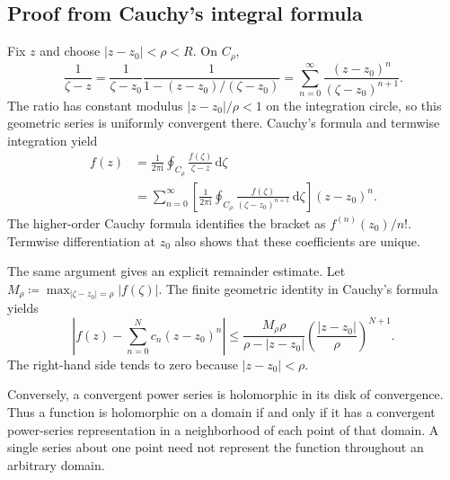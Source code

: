 \documentclass[11pt,a4paper]{article}
\theoremstyle{definition}
\theoremstyle{plain}
\newcommand{\dd}{\,\mathrm{d}}
\begin{document}
\subsection{Proof from Cauchy's integral formula}
Fix $z$ and choose $|z-z_0|<\rho<R$. On $C_\rho$,
\begin{equation}\label{eq:14}
\frac1{\zeta-z}
 =\frac1{\zeta-z_0}
    \frac1{1-(z-z_0)/(\zeta-z_0)}
 =\sum_{n=0}^{\infty}
       \frac{(z-z_0)^n}{(\zeta-z_0)^{n+1}}.
\end{equation}
The ratio has constant modulus $|z-z_0|/\rho<1$ on the integration
circle, so this geometric series is uniformly convergent there.
Cauchy's formula and termwise integration yield
\begin{equation}\label{eq:15}
\begin{aligned}
 f(z)&=\frac1{2\pi \mathrm{i}}\oint_{C_\rho}
                         \frac{f(\zeta)}{\zeta-z}\dd\zeta\\
 &=\sum_{n=0}^{\infty}
    \left[\frac1{2\pi \mathrm{i}}\oint_{C_\rho}
       \frac{f(\zeta)}{(\zeta-z_0)^{n+1}}\dd\zeta\right](z-z_0)^n.
\end{aligned}
\end{equation}
The higher-order Cauchy formula identifies the bracket as
$f^{(n)}(z_0)/n!$. Termwise differentiation at $z_0$ also shows that
these coefficients are unique.

The same argument gives an explicit remainder estimate. Let
$M_\rho\coloneqq\max_{|\zeta-z_0|=\rho}|f(\zeta)|$. The finite geometric
identity in Cauchy's formula yields
\begin{equation}\label{eq:16}
\left|f(z)-\sum_{n=0}^{N}c_n(z-z_0)^n\right|
 \leq\frac{M_\rho\rho}{\rho-|z-z_0|}
       \left(\frac{|z-z_0|}{\rho}\right)^{N+1}.
\end{equation}
The right-hand side tends to zero because $|z-z_0|<\rho$.

Conversely, a convergent power series is holomorphic in its disk of
convergence. Thus a function is holomorphic on a domain if and only if
it has a convergent power-series representation in a neighborhood of
each point of that domain. A single series about one point need not
represent the function throughout an arbitrary domain.
\end{document}
